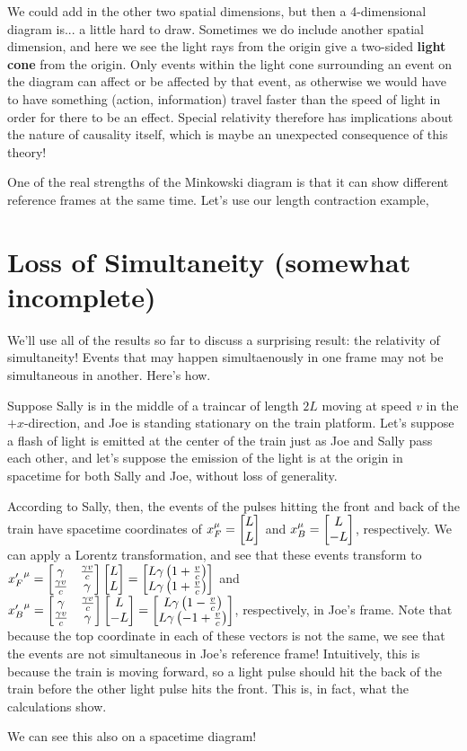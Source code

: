 \documentclass[12pt]{scrartcl}
\begin{document}
We could add in the other two spatial dimensions, but then a 4-dimensional diagram is... a little hard to draw. Sometimes we do include another spatial dimension, and here we see the light rays from the origin give a two-sided \textbf{light cone} from the origin. Only events within the light cone surrounding an event on the diagram can affect or be affected by that event, as otherwise we would have to have something (action, information) travel faster than the speed of light in order for there to be an effect. Special relativity therefore has implications about the nature of causality itself, which is maybe an unexpected consequence of this theory!

One of the real strengths of the Minkowski diagram is that it can show different reference frames at the same time. Let's use our length contraction example,

\section{Loss of Simultaneity (somewhat incomplete)}
We'll use all of the results so far to discuss a surprising result: the relativity of simultaneity! Events that may happen simultaenously in one frame may not be simultaneous in another. Here's how.

Suppose Sally is in the middle of a traincar of length $2L$ moving at speed $v$ in the $+x$-direction, and Joe is standing stationary on the train platform. Let's suppose a flash of light is emitted at the center of the train just as Joe and Sally pass each other, and let's suppose the emission of the light is at the origin in spacetime for both Sally and Joe, without loss of generality.

According to Sally, then, the events of the pulses hitting the front and back of the train have spacetime coordinates of $x_F^\mu = \begin{bmatrix}L \\ L\end{bmatrix}$ and $x_B^\mu = \begin{bmatrix}L \\ -L\end{bmatrix}$, respectively. We can apply a Lorentz transformation, and see that these events transform to ${x'_F}^\mu = \begin{bmatrix}\gamma & \frac{\gamma v}{c} \\ \frac{\gamma v}{c} & \gamma\end{bmatrix}  \begin{bmatrix}L \\ L\end{bmatrix} =
	\begin{bmatrix}L\gamma\left(1+\frac{v}{c}\right) \\ L\gamma\left(1+\frac{v}{c}\right)\end{bmatrix}$ and
${x'_B}^\mu = \begin{bmatrix}\gamma & \frac{\gamma v}{c} \\ \frac{\gamma v}{c} & \gamma\end{bmatrix}  \begin{bmatrix}L \\ -L\end{bmatrix} = \begin{bmatrix}L\gamma\left(1-\frac{v}{c}\right) \\ L\gamma\left(-1+\frac{v}{c}\right)\end{bmatrix}$, respectively, in Joe's frame. Note that because the top coordinate in each of these vectors is not the same, we see that the events are not simultaneous in Joe's reference frame! Intuitively, this is because the train is moving forward, so a light pulse should hit the back of the train  before the other light pulse hits the front. This is, in fact, what the calculations show.

We can see this also on a spacetime diagram!
\end{document}
